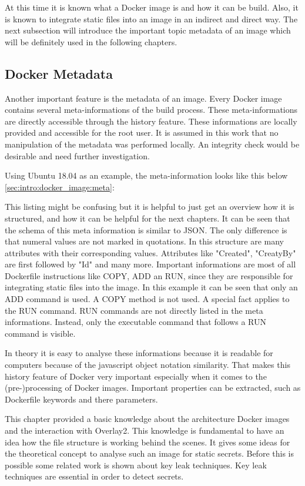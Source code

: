 At this time it is known what a Docker image is and how it can be build. Also, it is known to integrate static files into an image in an indirect and direct way.  The next subsection will introduce the important topic metadata of an image which will be definitely used in the following chapters. 

\subsection{Docker Metadata}
\label{sec:intro:docker_image:docker_img:meta}
Another important feature is the metadata of an image. Every Docker image contains several meta-informations of the build process. These meta-informations are directly accessible through the history feature. 
These informations are locally provided and accessible for the root user. 
It is assumed in this work that no manipulation of the metadata was performed locally. An integrity check would be desirable and need further investigation.

Using Ubuntu 18.04 as an example, the meta-information looks like this below \ref{sec:intro:docker_image:meta}:

This listing might be confusing but it is helpful to just get an overview how it is structured, and how it can be helpful for the next chapters.
It can be seen that the schema of this meta information is similar to JSON. The only difference is that numeral values are not marked in quotations. In this structure are many attributes with their corresponding values. Attributes like "Created", "CreatyBy" are first followed by "Id" and many more. 	
Important informations are most of all Dockerfile instructions like COPY, ADD an RUN, since they are responsible for integrating static files into the image.
In this example it can be seen that only an ADD command is used. A COPY method is not used.
A special fact applies to the RUN command. RUN commands are not directly listed in the meta informations.
Instead, only the executable command that follows a RUN command is visible.

In theory it is easy to analyse these informations because it is readable for computers because of the javascript object notation similarity.
That makes this history feature of Docker very important especially when it comes to the (pre-)processing of Docker images.	 Important properties can be extracted, such as Dockerfile keywords and there parameters.

This chapter provided a basic knowledge about the architecture Docker images and the interaction with Overlay2. This knowledge is fundamental to have an idea how the file structure is working behind the scenes. It gives some ideas for the theoretical concept to analyse such an image for static secrets.
Before this is possible some related work is shown about key leak techniques. Key leak techniques are essential in order to detect secrets.
